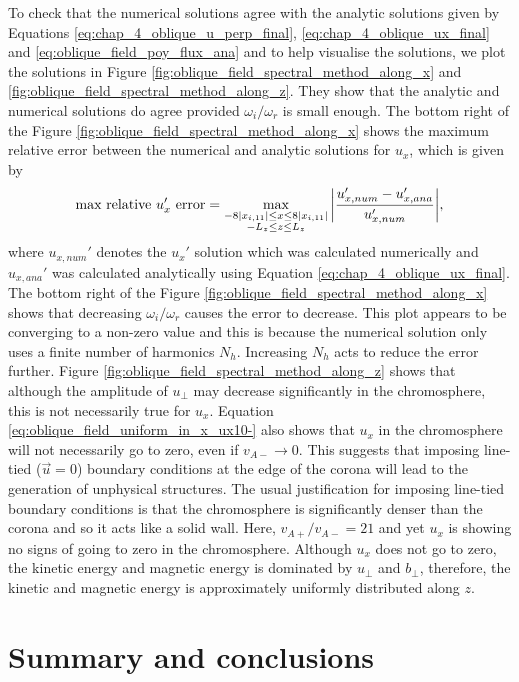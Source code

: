 To check that the numerical solutions agree with the analytic solutions given by Equations \eqref{eq:chap_4_oblique_u_perp_final}, \eqref{eq:chap_4_oblique_ux_final} and \eqref{eq:oblique_field_poy_flux_ana} and to help visualise the solutions, we plot the solutions in Figure \ref{fig:oblique_field_spectral_method_along_x} and \ref{fig:oblique_field_spectral_method_along_z}. They show that the analytic and numerical solutions do agree provided $\omega_i/\omega_r$ is small enough. The bottom right of the Figure \ref{fig:oblique_field_spectral_method_along_x} shows the maximum relative error between the numerical and analytic solutions for $u_x$, which is given by
\begin{equation}
    \text{max relative $u_x'$ error} = \max_{\substack{-8|x_{i,11}|\le x\le 8|x_{i,11}| \\ -L_z\le z \le L_z}}\abs{\frac{u_{x,num}'-u_{x,ana}'}{u_{x,num}'}},
\end{equation}
where $u_{x,num}'$ denotes the $u_x'$ solution which was calculated numerically and $u_{x,ana}'$ was calculated analytically using Equation \eqref{eq:chap_4_oblique_ux_final}. The bottom right of the Figure \ref{fig:oblique_field_spectral_method_along_x} shows that decreasing $\omega_i/\omega_r$ causes the error to decrease. This plot appears to be converging to a non-zero value and this is because the numerical solution only uses a finite number of harmonics $N_h$. Increasing $N_h$ acts to reduce the error further. Figure \ref{fig:oblique_field_spectral_method_along_z} shows that although the amplitude of $u_\perp$ may decrease significantly in the chromosphere, this is not necessarily true for $u_x$. Equation \eqref{eq:oblique_field_uniform_in_x_ux10-} also shows that $u_x$ in the chromosphere will not necessarily go to zero, even if $v_{A-}\rightarrow0$. This suggests that imposing line-tied ($\vec{u}=0$) boundary conditions at the edge of the corona will lead to the generation of unphysical structures. The usual justification for imposing line-tied boundary conditions is that the chromosphere is significantly denser than the corona and so it acts like a solid wall. Here, $v_{A+}/v_{A-}=21$ and yet $u_x$ is showing no signs of going to zero in the chromosphere. Although $u_x$ does not go to zero, the kinetic energy and magnetic energy is dominated by $u_\perp$ and $b_\perp$, therefore, the kinetic and magnetic energy is approximately uniformly distributed along $z$.

\section{Summary and conclusions}
\label{sec:chap_4_conclusions}


